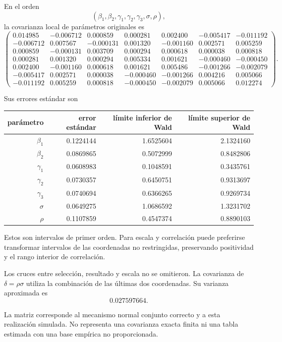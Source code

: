 \documentclass[11pt,a4paper]{article}
\begin{document}
En el orden
\[
(\beta_1,\beta_2,\gamma_1,\gamma_2,\gamma_3,\sigma,\rho),
\]
la covarianza local de
parámetros originales es
\[
\begin{pmatrix}0.014985&-0.006712&0.000859&0.000281&0.002400&-0.005417&-0.011192\\-0.006712&0.007567&-0.000131&0.001320&-0.001160&0.002571&0.005259\\0.000859&-0.000131&0.003709&0.000294&0.000618&0.000038&0.000818\\0.000281&0.001320&0.000294&0.005334&0.001621&-0.000460&-0.000450\\0.002400&-0.001160&0.000618&0.001621&0.005486&-0.001266&-0.002079\\-0.005417&0.002571&0.000038&-0.000460&-0.001266&0.004216&0.005066\\-0.011192&0.005259&0.000818&-0.000450&-0.002079&0.005066&0.012274\end{pmatrix}.
\]

Sus errores estándar son
\begin{center}\small\begin{tabular}{rrrr}\toprule
parámetro&error estándar&límite inferior de Wald&límite superior de Wald\\\midrule
\(\beta_1\)&0.1224144&1.6525604&2.1324160\\
\(\beta_2\)&0.0869865&0.5072999&0.8482806\\
\(\gamma_1\)&0.0608983&0.1048591&0.3435761\\
\(\gamma_2\)&0.0730357&0.6450751&0.9313697\\
\(\gamma_3\)&0.0740694&0.6366265&0.9269734\\
\(\sigma\)&0.0649275&1.0686592&1.3231702\\
\(\rho\)&0.1107859&0.4547374&0.8890103\\\bottomrule\end{tabular}\end{center}
Estos son intervalos de primer orden.
Para escala y correlación puede
preferirse transformar intervalos
de las coordenadas no restringidas,
preservando positividad y
el rango interior de correlación.

Los cruces entre selección,
resultado y escala no se
omitieron. La covarianza de
\(\delta=\rho\sigma\) utiliza
la combinación de las
últimas dos coordenadas.
Su varianza aproximada es
\[
0.027597664.
\]

La matriz corresponde al
mecanismo normal conjunto correcto
y a esta realización simulada.
No representa una covarianza
exacta finita ni una
tabla estimada con una
base empírica no proporcionada.
\end{document}
